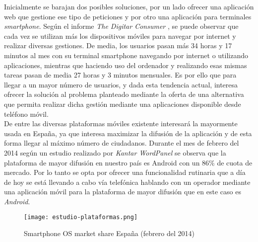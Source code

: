 Inicialmente se barajan dos posibles soluciones, por un lado ofrecer una aplicación web que gestione ese tipo de peticiones y por otro una aplicación para terminales \textit{
smartphone}. Según el informe \textit{The Digitar Consumer} \cite{the_nielsen_company_digital_2014}, se puede observar que cada vez se utilizan más los dispositivos móviles para navegar por internet y realizar diversas gestiones. De media, los usuarios pasan más 34 horas y 17 minutos al mes con su terminal smartphone navegando por internet o utilizando aplicaciones, mientras que haciendo uso del ordenador y realizando esas mismas tareas pasan de media 27 horas y 3 minutos mensuales. Es por ello que para llegar a un mayor número de usuarios, y dada esta tendencia actual, interesa ofrecer la solución al problema planteado mediante la oferta de una alternativa que permita realizar dicha gestión mediante una aplicaciones disponible desde teléfono móvil. \\

De entre las diversas plataformas móviles existente interesará la mayormente usada en España, ya que interesa maximizar la difusión de la aplicación y de esta forma llegar al máximo número de ciudadanos. Durante el mes de febrero del 2014 según un estudio realizado por \textit{Kantar WordPanel} \cite{kantar_wordpanel_publications_2014} se observa que la plataforma de mayor difusión en nuestro país es Android con un 86\% de cuota de mercado. Por lo tanto se opta por ofrecer una funcionalidad rutinaria que a día de hoy se está llevando a cabo vía telefónica hablando con un operador mediante una aplicación móvil para la plataforma de mayor difusión que en este caso es \textit{Android}.\\

\begin{figure}[H]
\begin{center}
    \texttt{[image: estudio-plataformas.png]}
\end{center}
    \caption{Smartphone OS market share España (febrero del 2014)}
\end{figure}
